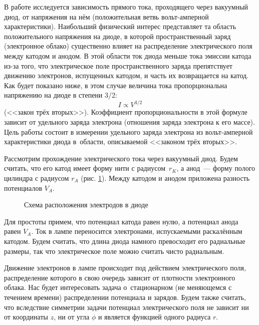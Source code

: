 
В работе исследуется зависимость прямого тока, проходящего через вакуумный диод, от напряжения на нём (положительная ветвь вольт-амперной характеристики). Наибольший физический интерес представляет та область положительного напряжения на диоде, в которой пространственный заряд (электронное облако) существенно влияет на распределение электрического поля между катодом и анодом. В этой области ток диода меньше тока эмиссии катода из-за того, что электрическое поле пространственного заряда препятствует движению электронов, испущенных катодом, и часть их возвращается на катод. Как будет показано ниже, в этом случае величина тока пропорциональна напряжению на диоде в степени 3/2:
\begin{equation}
	I\propto V^{3/2}
\end{equation}
(<<закон трёх вторых>>). Коэффициент пропорциональности в этой формуле зависит от удельного заряда электрона (отношения заряда электрона к его массе). Цель работы состоит в измерении удельного заряда электрона из вольт-амперной характеристики диода в~области, описываемой <<законом трёх вторых>>.

Рассмотрим прохождение электрического тока через вакуумный диод. Будем считать, что его катод имеет форму нити с
радиусом~$r_K$, а анод~--- форму полого цилиндра с радиусом $r_A$ (рис. \ref{fig3.2.1}). Между катодом и анодом приложена разность потенциалов $V_A$.

\begin{figure}
	\caption{Схема расположения электродов в диоде}
	\label{fig3.2.1}
\end{figure}

Для простоты примем, что потенциал катода равен нулю, а потенциал анода равен $V_A$. Ток в лампе переносится
электронами, испускаемыми раскалённым катодом. Будем считать, что длина диода намного превосходит его радиальные
размеры, так что электрическое поле можно считать чисто радиальным.

Движение электронов в лампе происходит под действием электрического поля, распределение которого в свою очередь зависит от плотности электронного облака. Нас будет интересовать задача о~стационарном (не меняющемся с течением времени) распределении потенциала и зарядов. Будем также считать, что вследствие симметрии задачи потенциал электрического поля не зависит ни от координаты $z$, ни от угла $\phi$ и является функцией одного радиуса $r$.

